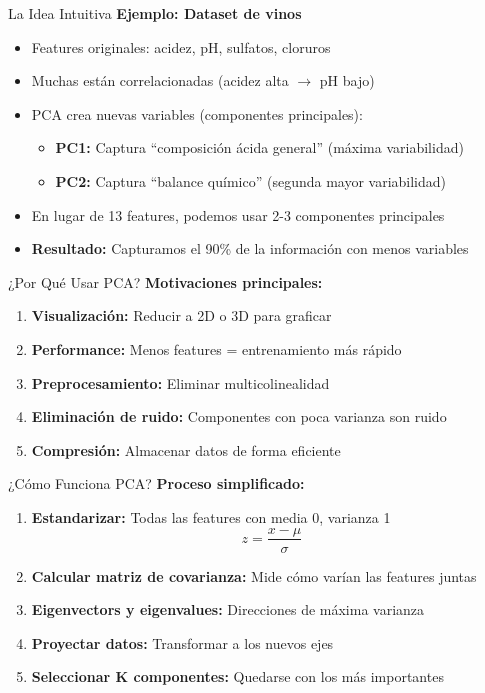 \documentclass{beamer}
\begin{document}
\begin{frame}{La Idea Intuitiva}
    \textbf{Ejemplo: Dataset de vinos}
    \begin{itemize}
        \item Features originales: acidez, pH, sulfatos, cloruros
        \item Muchas están correlacionadas (acidez alta $\rightarrow$ pH bajo)
        \item PCA crea nuevas variables (componentes principales):
        \begin{itemize}
            \item \textbf{PC1:} Captura ``composición ácida general'' (máxima variabilidad)
            \item \textbf{PC2:} Captura ``balance químico'' (segunda mayor variabilidad)   
        \end{itemize}
        \item En lugar de 13 features, podemos usar 2-3 componentes principales
        \item \textbf{Resultado:} Capturamos el 90\% de la información con menos variables
    \end{itemize}
\end{frame}

\begin{frame}{¿Por Qué Usar PCA?}
    \textbf{Motivaciones principales:}
    \begin{enumerate}
        \item \textbf{Visualización:} Reducir a 2D o 3D para graficar
        \item \textbf{Performance:} Menos features = entrenamiento más rápido
        \item \textbf{Preprocesamiento:} Eliminar multicolinealidad
        \item \textbf{Eliminación de ruido:} Componentes con poca varianza son ruido
        \item \textbf{Compresión:} Almacenar datos de forma eficiente
    \end{enumerate}
\end{frame}

\begin{frame}{¿Cómo Funciona PCA?}
    \textbf{Proceso simplificado:}
    \begin{enumerate}
        \item<1-> \textbf{Estandarizar:} Todas las features con media 0, varianza 1
        \[
        z = \frac{x - \mu}{\sigma}
        \]
        \item<2-> \textbf{Calcular matriz de covarianza:} Mide cómo varían las features juntas
        \item<3-> \textbf{Eigenvectors y eigenvalues:} Direcciones de máxima varianza
        \item<4-> \textbf{Proyectar datos:} Transformar a los nuevos ejes
        \item<5-> \textbf{Seleccionar K componentes:} Quedarse con los más importantes
    \end{enumerate}
\end{frame}
\end{document}

